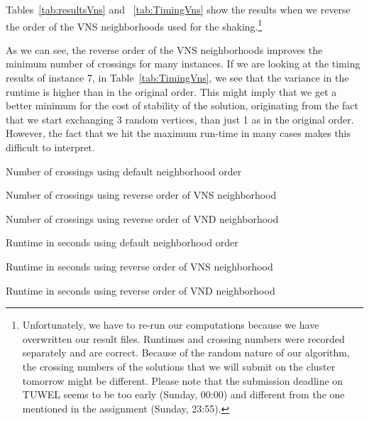 \documentclass{scrartcl}
\begin{document}
Tables~\ref{tab:resultsVns} and ~\ref{tab:TimingVns} show the results
when we reverse the order of the VNS neighborhoods used for the
shaking.\footnote{Unfortunately, we have to re-run our computations
  because we have overwritten our result files. Runtimes and crossing
  numbers were recorded separately and are correct. Because of the
  random nature of our algorithm, the crossing numbers of the
  solutions that we will submit on the cluster tomorrow might be
  different. Please note that the submission deadline on TUWEL seems
  to be too early (Sunday, 00:00) and different from the one mentioned
  in the assignment (Sunday, 23:55).}

As we can see, the reverse order of the VNS neighborhoods improves the
minimum number of crossings for many instances. If we are looking at
the timing results of instance 7, in Table~\ref{tab:TimingVns}, we see
that the variance in the runtime is higher than in the original order.
This might imply that we get a better minimum for the cost of
stability of the solution, originating from the fact that we start
exchanging 3 random vertices, than just 1 as in the original
order. However, the fact that we hit the maximum run-time in many
cases makes this difficult to interpret.


\begin{table}[!H]
  \centering
  \scriptsize
  
\caption{Number of crossings using default neighborhood order}
\label{tab:resultsOverall}
\end{table}

\begin{table}[!H]
  \centering
  \scriptsize
  
\caption{Number of crossings using reverse order of VNS neighborhood}
\label{tab:resultsVns}
\end{table}

\begin{table}[!H]
  \centering
  \scriptsize
  
\caption{Number of crossings using reverse order of VND neighborhood}
\label{tab:resultsVnd}
\end{table}

\clearpage

\begin{table}[H]
  \centering
  \scriptsize
  
\caption{Runtime in seconds using default neighborhood order}
\label{tab:Timing}
\end{table}

\begin{table}[H]
  \centering
  \scriptsize
  
\caption{Runtime in seconds using reverse order of VNS neighborhood}
\label{tab:TimingVns}
\end{table}

\begin{table}[H]
  \centering
  \scriptsize
  
\caption{Runtime in seconds using reverse order of VND neighborhood}
\label{tab:TimingVnd}
\end{table}
\end{document}
